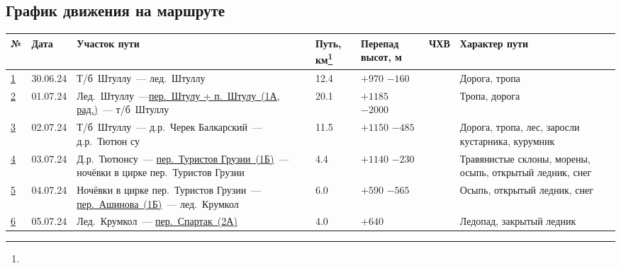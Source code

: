	\subsection{График движения на маршруте}
		{\footnotesize
		\begin{longtable}{|A|B|C|B|B|D|E|} \hline
			№							&	Дата 		&	Участок пути																																																&	Путь, км\footnote{\textOne}	&	Перепад высот, м		&	ЧХВ		&	Характер пути																\\ \hline
			\hyperref[subsec:Day1]{1}	&	30.06.24	&	Т/б~Штуллу~--- лед.~Штуллу																																													&	12.4						&	$+970$ $-160$			&			&	Дорога, тропа																\\ \hline
			\hyperref[subsec:Day2]{2}	&	01.07.24	&	Лед.~Штуллу~---\hyperref[subsec:main_obstacles]{пер.~Штулу + п.~Штулу~(1А, рад.)}~--- т/б~Штуллу																											&	20.1						&	$+1185$ $-2000$			&			&	Тропа, дорога																\\ \hline
			\hyperref[subsec:Day3]{3}	&	02.07.24	&	Т/б~Штуллу~--- д.р.~Черек Балкарский~--- д.р.~Тютюн	су																																						&	11.5						&	$+1150$ $-485$			&			&	Дорога, тропа, лес, заросли кустарника, курумник							\\ \hline
			\hyperref[subsec:Day4]{4}	&	03.07.24	&	Д.р.~Тютюнсу~--- \hyperref[subsec:main_obstacles]{пер.~Туристов Грузии~(1Б)}~--- ночёвки в цирке пер.~Туристов Грузии																						&	4.4							&	$+1140$ $-230$ 			&			&	Травянистые склоны, морены, осыпь, открытый ледник, снег					\\ \hline
			\hyperref[subsec:Day5]{5}	&	04.07.24	&	Ночёвки в цирке пер.~Туристов Грузии~--- \hyperref[subsec:main_obstacles]{пер.~Ашинова~(1Б)}~--- лед.~Крумкол																								&	6.0							&	$+590$ $-565$ 			&			&	Осыпь, открытый ледник, снег												\\ \hline
			\hyperref[subsec:Day6]{6}	&	05.07.24	&	Лед.~Крумкол~--- \hyperref[subsec:main_obstacles]{пер.~Спартак~(2А)}																																		&	4.0							&	$+640$ 			 		&			&	Ледопад, закрытый ледник													\\ \hline

\end{longtable}}
